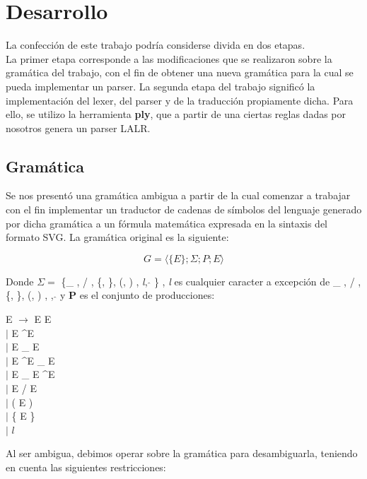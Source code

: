 \section{Desarrollo}

\indent \indent La confección de este trabajo podría considerse divida en dos etapas. \\
\indent La primer etapa corresponde a las modificaciones que se realizaron sobre la gramática del trabajo, con el fin de obtener una nueva gramática para la cual se pueda implementar un parser.
\indent La segunda etapa del trabajo significó la implementación del lexer, del parser y de la traducción propiamente dicha. Para ello, se utilizo la herramienta \textbf{ply}, que a partir de una ciertas reglas dadas por nosotros genera un parser LALR.\\

\subsection{Gramática}

\indent Se nos presentó una gramática ambigua a partir de la cual comenzar a trabajar con el fin implementar un traductor de cadenas de símbolos del lenguaje generado por dicha gramática a un fórmula matemática expresada en la sintaxis del formato SVG.
\indent La gramática original es la siguiente:

 \begin{equation}
    G = \langle \{ E\};\Sigma;P;E \rangle
 \end{equation}

\indent Donde $\Sigma = $ \{\_ , / , \{, \}, (, ) , \textit{l}, $\hat{}$ \} , \textit{l} es cualquier caracter a excepción de \_ , / , \{, \}, (, ) , , $\hat{}$  y \textbf{P} es el conjunto de producciones:

\begin{center}
 E $\rightarrow$ E E 
\\  $|$ E \textasciicircum E
\\  $|$ E \_ E
\\  $|$ E \textasciicircum E \_ E
\\  $|$ E \_ E \textasciicircum E
\\  $|$ E / E
\\  $|$ ( E )
\\  $|$ \{ E \} 
\\  $|$ $l$
\end{center}

\indent Al ser ambigua, debimos operar sobre la gramática para desambiguarla, teniendo en cuenta las siguientes restricciones:


